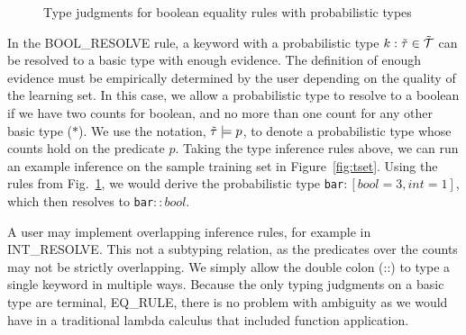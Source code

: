 {
\setlength{\abovecaptionskip}{-.05pt}
\setlength{\belowcaptionskip}{-15pt}
\begin{figure}
\caption{Type judgments for boolean equality rules with probabilistic types}
\label{fig:ptypes}
\end{figure}
}

In the {\scriptsize BOOL\_RESOLVE} rule, a keyword with a probabilistic type $k : \tilde{\tau} \in \tilde{\mathcal{T}}$ can be resolved to a basic type with enough evidence.
The definition of enough evidence must be empirically determined by the user depending on the quality of the learning set.
In this case, we allow a probabilistic type to resolve to a boolean if we have two counts for boolean, and no more than one count for any other basic type ($\ast$).
We use the notation, $\tilde{\tau} \models p$, to denote a probabilistic type whose counts hold on the predicate $p$.
Taking the type inference rules above, we can run an example inference on the sample training set in Figure~\ref{fig:tset}.
Using the rules from Fig.~\ref{fig:ptypes}, we would derive the probabilistic type \texttt{bar}$:[bool=3,int=1]$, which then resolves to \texttt{bar}$::bool$.
 
A user may implement overlapping inference rules, for example in {\scriptsize INT\_RESOLVE}.
This not a subtyping relation, as the predicates over the counts may not be strictly overlapping.
We simply allow the double colon (::) to type a single keyword in multiple ways.
Because the only typing judgments on a basic type are terminal, {\scriptsize EQ\_RULE}, there is no problem with ambiguity as we would have in a traditional lambda calculus that included function application.

